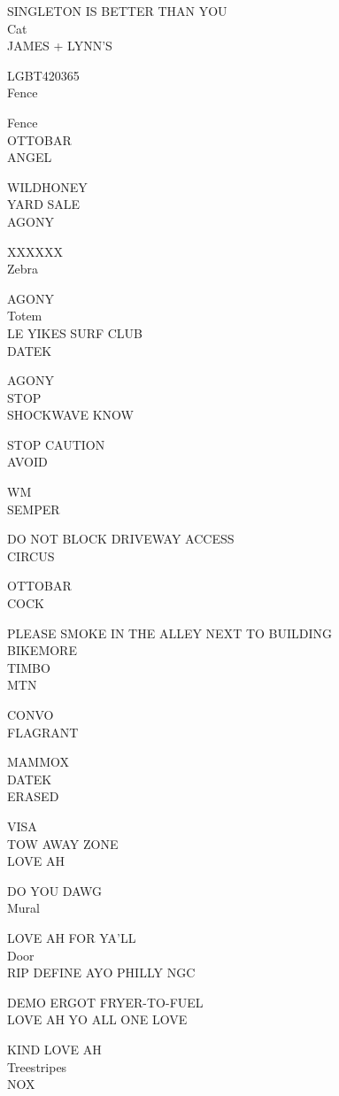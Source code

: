 \documentclass[10pt,letterpaper]{article}
\begin{document}
SINGLETON IS BETTER THAN YOU\\
Cat\\
JAMES + LYNN'S

LGBT420365\\
Fence

Fence\\
OTTOBAR\\
ANGEL

WILDHONEY\\
YARD SALE\\
AGONY

XXXXXX\\
Zebra

AGONY\\
Totem\\
LE YIKES SURF CLUB\\
DATEK

AGONY\\
STOP\\
SHOCKWAVE KNOW

STOP CAUTION\\
AVOID

WM\\
SEMPER

DO NOT BLOCK DRIVEWAY ACCESS\\
CIRCUS

OTTOBAR\\
COCK

PLEASE SMOKE IN THE ALLEY NEXT TO BUILDING\\
BIKEMORE\\
TIMBO\\
MTN

CONVO\\
FLAGRANT

MAMMOX\\
DATEK\\
ERASED

VISA\\
TOW AWAY ZONE\\
LOVE AH

DO YOU DAWG\\
Mural

LOVE AH FOR YA'LL\\
Door\\
RIP DEFINE AYO PHILLY NGC

DEMO ERGOT FRYER{-}TO{-}FUEL\\
LOVE AH YO ALL ONE LOVE

KIND LOVE AH\\
Treestripes\\
NOX
\end{document}
